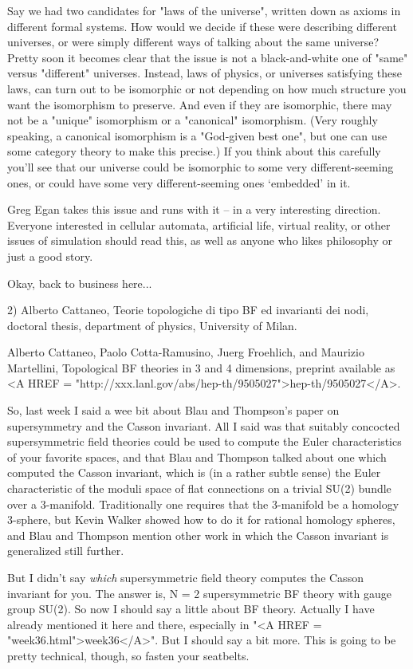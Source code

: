 Say we had two candidates for "laws of the universe", written down as 
axioms in different formal systems.   How would we decide if these were 
describing different universes, or were simply different ways of talking 
about the same universe?  Pretty soon it becomes clear that the issue is not 
a black-and-white one of "same" versus "different" universes.  Instead, laws 
of physics, or universes satisfying these laws, can turn out to be isomorphic 
or not depending on how much structure you want the 
isomorphism to preserve.   And even if they are isomorphic, there
may not be a "unique" isomorphism or a "canonical" isomorphism.
(Very roughly speaking, a canonical isomorphism is a "God-given
best one", but one can use some category theory to make this
precise.)  If you think about this carefully you'll see that our
universe could be isomorphic to some very different-seeming ones,
or could have some very different-seeming ones `embedded' in 
it.

Greg Egan takes this issue and runs with it -- in a very interesting
direction.  Everyone interested in cellular automata, artificial life,
virtual reality, or other issues of simulation should read this, as
well as anyone who likes philosophy or just a good story.

Okay, back to business here...

2)  Alberto Cattaneo, Teorie topologiche di tipo BF ed invarianti dei 
nodi, doctoral thesis, department of physics, University of Milan.

Alberto Cattaneo, Paolo Cotta-Ramusino, Juerg Froehlich, 
and Maurizio Martellini, Topological BF theories in 3 and 4
dimensions, preprint available as <A HREF = "http://xxx.lanl.gov/abs/hep-th/9505027">hep-th/9505027</A>.

So, last week I said a wee bit about Blau and Thompson's paper
on supersymmetry and the Casson invariant.  All I said was that
suitably concocted supersymmetric field theories could be used to
compute the Euler characteristics of your favorite spaces, and that
Blau and Thompson talked about one which computed the Casson
invariant, which is (in a rather subtle sense) the Euler characteristic
of the moduli space of flat connections on a trivial SU(2) bundle
over a 3-manifold.  Traditionally one requires that the 3-manifold be
a homology 3-sphere, but Kevin Walker showed
how to do it for rational homology spheres, and Blau and
Thompson mention other work in which the Casson invariant is
generalized still further.  

But I didn't say \emph{which} supersymmetric field theory computes
the Casson invariant for you.  The answer is, N = 2 supersymmetric
BF theory with gauge group SU(2).  So now I should say a little about
BF theory.  Actually I have already mentioned it here and there, especially
in "<A HREF = "week36.html">week36</A>".  But I should say a bit more.  This is going to be pretty 
technical, though, so fasten your seatbelts.

